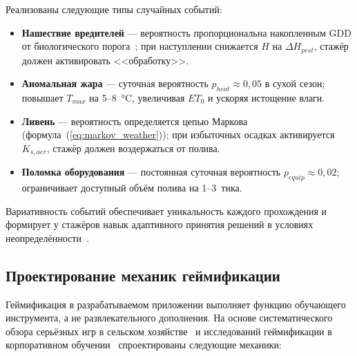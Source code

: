 Реализованы следующие типы случайных событий:
\begin{itemize}
	\item \textbf{Нашествие вредителей} --- вероятность
	пропорциональна накопленным GDD от биологического
	порога~\cite{vieira2025_wheat_sawfly_gdd}; при наступлении
	снижается $H$ на $\Delta H_{pest}$, стажёр должен
	активировать <<обработку>>.
	\item \textbf{Аномальная жара} --- суточная вероятность
	$p_{heat} \approx 0{,}05$ в сухой сезон; повышает
	$T_{max}$ на 5--8~°C, увеличивая $ET_0$ и ускоряя
	истощение влаги.
	\item \textbf{Ливень} --- вероятность определяется цепью
	Маркова (формула~(\ref{eq:markov_weather})); при
	избыточных осадках активируется $K_{s,aer}$, стажёр
	должен воздержаться от полива.
	\item \textbf{Поломка оборудования} --- постоянная
	суточная вероятность $p_{equip} \approx 0{,}02$;
	ограничивает доступный объём полива на 1--3~тика.
\end{itemize}

Вариативность событий обеспечивает уникальность каждого
прохождения и формирует у стажёров навык адаптивного
принятия решений в условиях
неопределённости~\cite{newlands2014_probabilistic_yield}.


\subsection{Проектирование механик геймификации}

Геймификация в разрабатываемом приложении выполняет функцию
обучающего инструмента, а не развлекательного дополнения.
На основе систематического обзора серьёзных игр в сельском
хозяйстве~\cite{madeira2024_serious_games_agriculture,
	cinar2024_serious_games_scoping} и исследований геймификации
в корпоративном обучении~\cite{shen2024_gamification_workforce}
спроектированы следующие механики:


